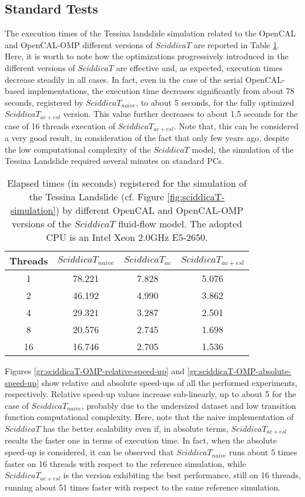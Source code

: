 \subsection{Standard Tests}
\label{sec:standard_tests}
The execution times of the Tessina landslide simulation related to
the OpenCAL and OpenCAL-OMP different versions of $SciddicaT$ are
reported in Table \ref{tab:sciddicaT-OMP-execution-times}. Here,
it is worth to note how the optimizations progressively introduced
in the different versions of $SciddicaT$ are effective and, as
expected, execution times decrease steadily in all cases. In fact,
even in the case of the serial OpenCAL-based implementations, the
execution time decreases significantly from about 78 seconds,
registered by $SciddicaT_{naive}$, to about 5 seconds, for the
fully optimized $SciddicaT_{ac+esl}$ version. This value further
decreases to about 1.5 seconds for the case of 16 threads
execution of $SciddicaT_{ac+esl}$. Note that, this can be
considered a very good result, in consideration of the fact that
only few years ago, despite the low computational complexity of
the $SciddicaT$ model, the simulation of the Tessina Landslide
required several minutes on standard PCs.

\begin{table}
	\centering
	\begin{tabular}{cccc}
		\hline Threads & $SciddicaT_{naive}$ & $SciddicaT_{ac}$ &
		$SciddicaT_{ac+esl}$ \\ \hline 1 & 78.221 & 7.828 & 5.076\\ 2 &
		46.192 & 4.990 & 3.862\\ 4 & 29.321 & 3.287 & 2.501\\ 8 & 20.576
		& 2.745 & 1.698\\ 16 & 16.746 & 2.705 & 1.536\\ \hline
	\end{tabular}
	\caption{Elapsed times (in seconds) registered for the simulation of the
		Tessina Landslide (cf. Figure \ref{fig:sciddicaT-simulation}) by
		different OpenCAL and OpenCAL-OMP versions of the $SciddicaT$
		fluid-flow model. The adopted CPU is an Intel Xeon 2.0GHz E5-2650.}
	\label{tab:sciddicaT-OMP-execution-times}
\end{table}

Figures \ref{gr:sciddicaT-OMP-relative-speed-up} and
\ref{gr:sciddicaT-OMP-absolute-speed-up} show relative and
absolute speed-ups of all the performed experiments,
respectively. Relative speed-up values increase sub-linearly, up
to about 5 for the case of $SciddicaT_{naive}$, probably due to
the undersized dataset and low transition function computational
complexity. Here, note that the naive implementation of
$SciddicaT$ has the better scalability even if, in absolute terms,
$SciddicaT_{ac+esl}$ results the faster one in terms of execution
time. In fact, when the absolute speed-up is considered, it can be
observed that $SciddicaT_{naive}$ runs about 5 times faster on 16
threads with respect to the reference simulation, while
$SciddicaT_{ac+esl}$ is the version exhibiting the best
performance, still on 16 threads, running about 51 times faster
with respect to the same reference simulation.

